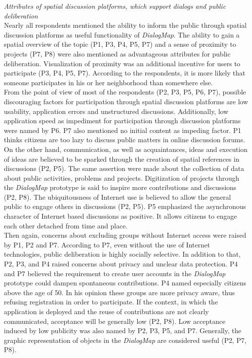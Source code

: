 \textit{Attributes of spatial discussion platforms, which support dialogs and public deliberation}\\
Nearly all respondents mentioned the ability to inform the public through spatial discussion platforms as useful functionality of \textit{DialogMap}. The ability to gain a spatial overview of the topic (P1, P3, P4, P5, P7) and a sense of proximity to projects (P7, P8) were also mentioned as advantageous attributes for public deliberation. Visualization of proximity was an additional incentive for users to participate (P3, P4, P5, P7). According to the respondents, it is more likely that someone participates in his or her neighborhood than somewhere else.\\
From the point of view of most of the respondents (P2, P3, P5, P6, P7), possible discouraging factors for participation through spatial discussion platforms are low usability, application errors and unstructured discussions. Additionally, low application speed as impediment for participation through discussion platforms were named by P6. P7 also mentioned no initial content as impeding factor. P1 thinks citizens are too lazy to discuss public matters in online discussion forums.\\
On the other hand, communication, as well as acquaintances, ideas and execution of ideas are believed to be sparked through the creation of spatial references in discussions (P2, P5). The same assertion were made about the collection of data about public activities, problems and projects. Digitization of projects through the \textit{DialogMap} prototype is said to inspire more contributions and discussions (P2, P8). The ubiquitousness of Internet use is believed to allow the general public to engage others in discussions (P2, P5). P5 emphasized the asynchronous character of Internet based discussions as positive. It allows citizens to engage each other detached from time and place.\\
Then again, concerns about excluding groups without Internet access were raised by P1, P2 and P7. According to P7, even without the use of Internet technologies, public deliberation is highly socially selective. In addition to that, P2, P3, and P4 raised concerns about privacy and unclear data protection. P4 and P7 believed the requirement to create user accounts in the \textit{DialogMap} prototype could dampen spontaneous contributions. P4 named especially citizens above the age of 50. In his opinion these groups are more privacy aware, thus refusing registration in order to participate. If the context, in which the application is deployed and the reuse of contributions are not clearly communicated, acceptance will be generally low (P2, P8). Low acceptance induced by low publicity was also named by P2, P3, P5, and P7. Generally, the graphic representation of objects in the \textit{DialogMap} are considered useful (P2, P7, P8).\\
